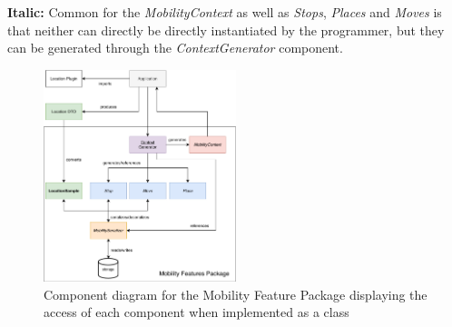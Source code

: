 \textbf{Italic:} Common for the \textit{MobilityContext} as well as \textit{Stops}, \textit{Places} and \textit{Moves} is that neither can directly be directly instantiated by the programmer, but they can be generated through the \textit{ContextGenerator} component. \\

\begin{figure}[h]
    \centering
    \includegraphics[width=0.5\textwidth]{images/diagrams/api-diagram.pdf}
    \caption{Component diagram for the Mobility Feature Package displaying the access of each component when implemented as a class}
    \label{fig:component-diagram}
\end{figure}

